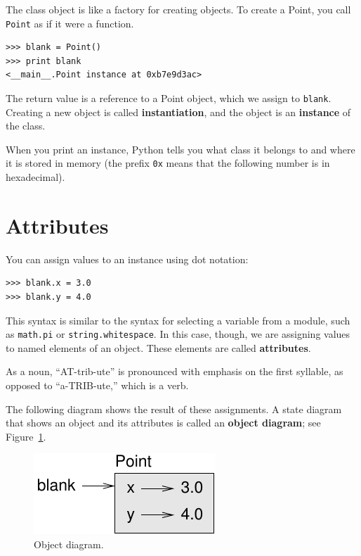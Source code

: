 \documentclass[10pt]{book}
\begin{document}
\begin{CJK}{UTF8}{gbsn}
The class object is like a factory for creating objects.  To create a
Point, you call {\tt Point} as if it were a function.

\begin{verbatim}
>>> blank = Point()
>>> print blank
<__main__.Point instance at 0xb7e9d3ac>
\end{verbatim}
%
The return value is a reference to a Point object, which we
assign to {\tt blank}.  
Creating a new object is called
{\bf instantiation}, and the object is an {\bf instance} of
the class.

When you print an instance, Python tells you what class it
belongs to and where it is stored in memory (the prefix
{\tt 0x} means that the following number is in hexadecimal).


\section{Attributes}
\label{attributes}

You can assign values to an instance using dot notation:

\begin{verbatim}
>>> blank.x = 3.0
>>> blank.y = 4.0
\end{verbatim}
%
This syntax is similar to the syntax for selecting a variable from a
module, such as {\tt math.pi} or {\tt string.whitespace}.  In this case,
though, we are assigning values to named elements of an object.
These elements are called {\bf attributes}.

As a noun, ``AT-trib-ute'' is pronounced with emphasis on the first
syllable, as opposed to ``a-TRIB-ute,'' which is a verb.

The following diagram shows the result of these assignments.
A state diagram that shows an object and its attributes is
called an {\bf object diagram}; see Figure~\ref{fig.point}.

\begin{figure}
\centerline
{\includegraphics[scale=0.8]{figs/point.pdf}}
\caption{Object diagram.}
\label{fig.point}
\end{figure}



\end{CJK}
\end{document}
